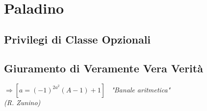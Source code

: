 \chapter{Paladino}

\section{Privilegi di Classe Opzionali}

\section{Giuramento di Veramente Vera Verità}

\begin{DndReadAloud}
  \it
  \begin{math}[a = A] \Rightarrow [a = (-1)^{2a^2}(A-1)+1]\end{math} \ "Banale aritmetica" \\ (R. Zunino)
\end{DndReadAloud}
